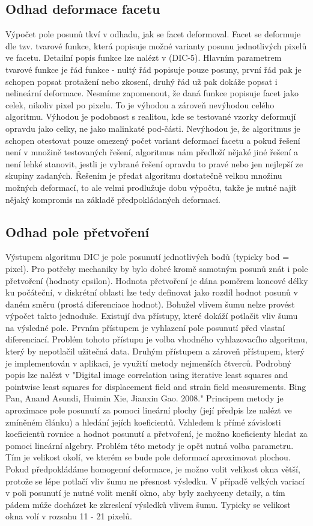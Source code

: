 \documentclass[a4paper,12pt]{article}
\begin{document}
\subsection{Odhad deformace facetu}
Výpočet pole posunů tkví v odhadu, jak se facet deformoval. Facet se deformuje dle tzv. tvarové funkce, která popisuje možné varianty posunu jednotlivých pixelů ve facetu. Detailní popis funkce lze nalézt v (DIC-5). Hlavním parametrem tvarové funkce je řád funkce - nultý řád popisuje pouze posuny, první řád pak je schopen popsat protažení nebo zkosení, druhý řád už pak dokáže popsat i nelineární deformace. Nesmíme zapomenout, že daná funkce popisuje facet jako celek, nikoliv pixel po pixelu. To je výhodou a zároveň nevýhodou celého algoritmu. Výhodou je podobnost s realitou, kde se testované vzorky deformují opravdu jako celky, ne jako malinkaté pod-části. Nevýhodou je, že algoritmus je schopen otestovat pouze omezený počet variant deformací facetu a pokud řešení není v množině testovaných řešení, algoritmus nám předloží nějaké jiné řešení a není lehké stanovit, jestli je vybrané řešení opravdu to pravé nebo jen nejlepší ze skupiny zadaných. Řešením je předat algoritmu dostatečně velkou množinu možných deformací, to ale velmi prodlužuje dobu výpočtu, takže je nutné najít nějaký kompromis na základě předpokládaných deformací.
\subsection{Odhad pole přetvoření}
Výstupem algoritmu DIC je pole posunutí jednotlivých bodů (typicky bod = pixel). Pro potřeby mechaniky by bylo dobré kromě samotným posunů znát i pole přetvoření (hodnoty epsilon). Hodnota přetvoření je dána poměrem koncové délky ku počáteční, v diskrétní oblasti lze tedy definovat jako rozdíl hodnot posunů v daném směru (prostá diferenciace hodnot). Bohužel vlivem šumu nelze provést výpočet takto jednoduše. Existují dva přístupy, které dokáží potlačit vliv šumu na výsledné pole. Prvním přístupem je vyhlazení pole posunutí před vlastní diferenciací. Problém tohoto přístupu je volba vhodného vyhlazovacího algoritmu, který by nepotlačil užitečná data. Druhým přístupem a zároveň přístupem, který je implementován v aplikaci, je využití metody nejmenších čtverců. Podrobný popis lze nalézt v "Digital image correlation using iterative least squares and pointwise least squares for displacement field and strain field measurements. Bing Pan, Anand Asundi, Huimin Xie, Jianxin Gao. 2008." Principem metody je aproximace pole posunutí za pomoci lineární plochy (její předpis lze nalézt ve zmíněném článku) a hledání jejích koeficientů. Vzhledem k přímé závislosti koeficientů rovnice a hodnot posunutí a přetvoření, je možno koeficienty hledat za pomoci lineární algebry. Problém této metody je opět nutná volba parametru. Tím je velikost okolí, ve kterém se bude pole deformací aproximovat plochou. Pokud předpokládáme homogenní deformace, je možno volit velikost okna větší, protože se lépe potlačí vliv šumu ne přesnost výsledku. V případě velkých variací v poli posunutí je nutné volit menší okno, aby byly zachyceny detaily, a tím pádem může docházet ke zkreslení výsledků vlivem šumu. Typicky se velikost okna volí v rozsahu 11 - 21 pixelů.
\newpage
\end{document}
